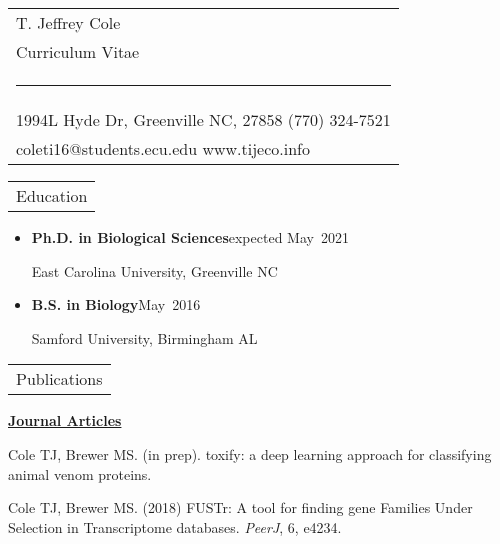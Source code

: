 \documentclass{article}
\renewcommand{\section}[1]{%
  \begin{tabular}{p{\dimexpr\linewidth-2\tabcolsep}}
    \cellcolor{black!10}\large\strut #1
  \end{tabular}%
}
\newcommand{\heading}[2][\relax]{\textbf{#2}\hfill#1\par\nobreak}
\newcommand{\pubheading}[1]{\par\bigskip\underline{\textbf{#1}}\par}
\begin{document}


\begin{tabular}{@{}p{\linewidth}@{}}
  \centering\LARGE T. Jeffrey Cole \\
  \centering\large \strut Curriculum Vitae \\[\jot]
  \hrule \mbox{}\\[\dimexpr-.4pt+\jot]
  \small 1994L Hyde Dr, Greenville NC, 27858 \hfill (770) 324-7521 \\
  \small coleti16@students.ecu.edu \hfill www.tijeco.info 
\end{tabular}

\renewcommand{\arraystretch}{1.5}%

\section{Education}

\begin{itemize}
  \item \heading[expected May~2021]{Ph.D. in Biological Sciences}
    East Carolina University, Greenville NC

  \item \heading[May~2016]{B.S. in Biology}
    Samford University, Birmingham AL
\end{itemize}


\section{Publications}

\pubheading{Journal Articles}

\begin{myreferences}
  \item Cole TJ, Brewer MS. (in prep). toxify: a deep learning approach for classifying animal
venom proteins.

  \item Cole TJ, Brewer MS. (2018) FUSTr: A tool for finding gene Families Under Selection in
Transcriptome databases. \textit{PeerJ}, 6, e4234.
\end{myreferences}
\end{document}
